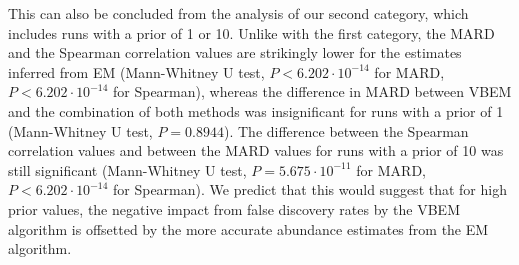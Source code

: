 This can also be concluded from the analysis of our second category, which includes runs with a prior of 1 or 10. Unlike with the first category, the $\mathrm{MARD}$ and the Spearman correlation values are strikingly lower for the estimates inferred from EM (Mann-Whitney U test, $P < 6.202\cdot 10^{-14}$ for $\mathrm{MARD}$, $P < 6.202\cdot 10^{-14}$ for Spearman), whereas the difference in MARD between VBEM and the combination of both methods was insignificant for runs with a prior of 1 (Mann-Whitney U test, $P = 0.8944$). The difference between the Spearman correlation values and between the MARD values for runs with a prior of 10 was still significant (Mann-Whitney U test, $P = 5.675 \cdot 10^{-11}$ for $\mathrm{MARD}$, $P < 6.202\cdot 10^{-14}$ for Spearman). We predict that this would suggest that for high prior values, the negative impact from false discovery rates by the VBEM algorithm is offsetted by the more accurate abundance estimates from the EM algorithm. 
